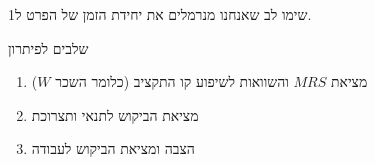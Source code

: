 \documentclass{beamer}
\begin{document}
\begin{RTL}
\begin{frame}[allowframebreaks]
    שימו לב שאנחנו מנרמלים את יחידת הזמן של הפרט ל1.

    \framebreak

    \begin{exampleblock}{שלבים לפיתרון}
        \begin{enumerate}
            \item מציאת $MRS$ והשוואות לשיפוע קו התקציב (כלומר השכר $W$)
            \item מציאת הביקוש לתנאי ותצרוכת
            \item הצבה ומציאת הביקוש לעבודה
        \end{enumerate}
    \end{exampleblock}

    

\end{frame}
\end{RTL}
\end{document}
